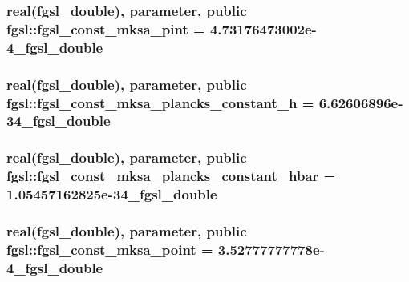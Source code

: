 \subsubsection[{fgsl\+\_\+const\+\_\+mksa\+\_\+pint}]{\setlength{\rightskip}{0pt plus 5cm}real({\bf fgsl\+\_\+double}), parameter, public fgsl\+::fgsl\+\_\+const\+\_\+mksa\+\_\+pint = 4.\+73176473002e-\/4\+\_\+fgsl\+\_\+double}\label{namespacefgsl_a11b62fc3ced19e2c4f1ad227de09f9f0}
\hypertarget{namespacefgsl_a1f1f5a27cac13f7f29c34ccb809e2eae}{}
\subsubsection[{fgsl\+\_\+const\+\_\+mksa\+\_\+plancks\+\_\+constant\+\_\+h}]{\setlength{\rightskip}{0pt plus 5cm}real({\bf fgsl\+\_\+double}), parameter, public fgsl\+::fgsl\+\_\+const\+\_\+mksa\+\_\+plancks\+\_\+constant\+\_\+h = 6.\+62606896e-\/34\+\_\+fgsl\+\_\+double}\label{namespacefgsl_a1f1f5a27cac13f7f29c34ccb809e2eae}
\hypertarget{namespacefgsl_a505da32ff79a7c317534298642a2ac3c}{}
\subsubsection[{fgsl\+\_\+const\+\_\+mksa\+\_\+plancks\+\_\+constant\+\_\+hbar}]{\setlength{\rightskip}{0pt plus 5cm}real({\bf fgsl\+\_\+double}), parameter, public fgsl\+::fgsl\+\_\+const\+\_\+mksa\+\_\+plancks\+\_\+constant\+\_\+hbar = 1.\+05457162825e-\/34\+\_\+fgsl\+\_\+double}\label{namespacefgsl_a505da32ff79a7c317534298642a2ac3c}
\hypertarget{namespacefgsl_ad8f1c0644b869b25114ce66526bd4a9d}{}
\subsubsection[{fgsl\+\_\+const\+\_\+mksa\+\_\+point}]{\setlength{\rightskip}{0pt plus 5cm}real({\bf fgsl\+\_\+double}), parameter, public fgsl\+::fgsl\+\_\+const\+\_\+mksa\+\_\+point = 3.\+52777777778e-\/4\+\_\+fgsl\+\_\+double}\label{namespacefgsl_ad8f1c0644b869b25114ce66526bd4a9d}
\hypertarget{namespacefgsl_a1b18b9e73da6e94185746f50a31ca4c3}{}
